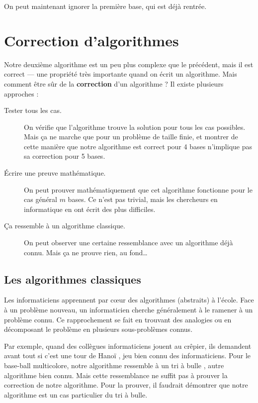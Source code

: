\documentclass[a5paper,pagesize,DIV=14]{scrbook}
\begin{document}
On peut maintenant ignorer la première base, qui est déjà rentrée.

\section*{Correction d'algorithmes}

Notre deuxième algorithme est un peu plus complexe que le précédent, mais il est
correct --- une propriété très importante quand on écrit un algorithme. Mais
comment être sûr de la \textbf{correction} d'un algorithme ? Il existe plusieurs
approches :

\begin{description}
\item[Tester tous les cas.] On vérifie que l'algorithme trouve la solution pour
  tous les cas possibles. Mais ça ne marche que pour un problème de taille
  finie, et montrer de cette manière que notre algorithme est correct pour 4
  bases n'implique pas sa correction pour 5 bases.
\item[Écrire une preuve mathématique.] On peut prouver mathématiquement que cet
  algorithme fonctionne pour le cas général $m$ bases. Ce n'est pas trivial,
  mais les chercheurs en informatique en ont écrit des plus difficiles.
\item[Ça ressemble à un algorithme classique.] On peut observer une certaine
  ressemblance avec un algorithme déjà connu. Mais ça ne prouve rien, au
  fond{\ldots}
\end{description}

\subsection*{Les algorithmes classiques}

Les informaticiens apprennent par c\oe{}ur des algorithmes (abstraits) à
l'école. Face à un problème nouveau, un informaticien cherche généralement à le
ramener à un problème connu. Ce rapprochement se fait en trouvant des analogies
ou en décomposant le problème en plusieurs sous-problèmes connus.

Par exemple, quand des collègues informaticiens jouent au crêpier, ils demandent
avant tout si c'est \og une tour de Hanoï \fg, jeu bien connu des
informaticiens. Pour le base-ball multicolore, notre algorithme ressemble à un
\og tri à bulle \fg, autre algorithme bien connu. Mais cette ressemblance ne
suffit pas à prouver la correction de notre algorithme. Pour la prouver, il
faudrait démontrer que notre algorithme est un cas particulier du tri à bulle.
 
\end{document}
